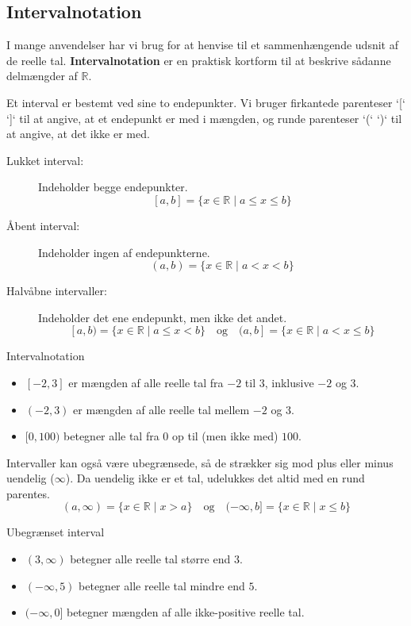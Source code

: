 \subsection*{Intervalnotation}
I mange anvendelser har vi brug for at henvise til et sammenhængende udsnit af de reelle tal. \textbf{Intervalnotation} er en praktisk kortform til at beskrive sådanne delmængder af $\mathbb{R}$.

Et interval er bestemt ved sine to endepunkter. Vi bruger firkantede parenteser `[` `]` til at angive, at et endepunkt er med i mængden, og runde parenteser `(` `)` til at angive, at det ikke er med.

\begin{description}
    \item[Lukket interval:] Indeholder begge endepunkter.
    \[ [a, b] = \{ x \in \mathbb{R} \mid a \leq x \leq b \} \]

    \item[Åbent interval:] Indeholder ingen af endepunkterne.
    \[ (a, b) = \{ x \in \mathbb{R} \mid a < x < b \} \]

    \item[Halvåbne intervaller:] Indeholder det ene endepunkt, men ikke det andet.
    \[ [a, b) = \{ x \in \mathbb{R} \mid a \leq x < b \} \quad \text{og} \quad (a, b] = \{ x \in \mathbb{R} \mid a < x \leq b \} \]
\end{description}

\begin{example} Intervalnotation
\begin{itemize}
    \item $[-2, 3]$ er mængden af alle reelle tal fra $-2$ til $3$, inklusive $-2$ og $3$.
    \item $(-2, 3)$ er mængden af alle reelle tal mellem $-2$ og $3$.
    \item $[0, 100)$ betegner alle tal fra $0$ op til (men ikke med) $100$.
\end{itemize}
\end{example}

Intervaller kan også være ubegrænsede, så de strækker sig mod plus eller minus uendelig ($\infty$). Da uendelig ikke er et tal, udelukkes det altid med en rund parentes.
\[ (a, \infty) = \{ x \in \mathbb{R} \mid x > a \} \quad \text{og} \quad (-\infty, b] = \{ x \in \mathbb{R} \mid x \leq b \} \]

\begin{example} Ubegrænset interval
\begin{itemize}
    \item $(3, \infty)$ betegner alle reelle tal større end $3$.
    \item $(-\infty, 5)$ betegner alle reelle tal mindre end $5$.
    \item $(-\infty, 0]$ betegner mængden af alle ikke-positive reelle tal.
\end{itemize}
\end{example}

